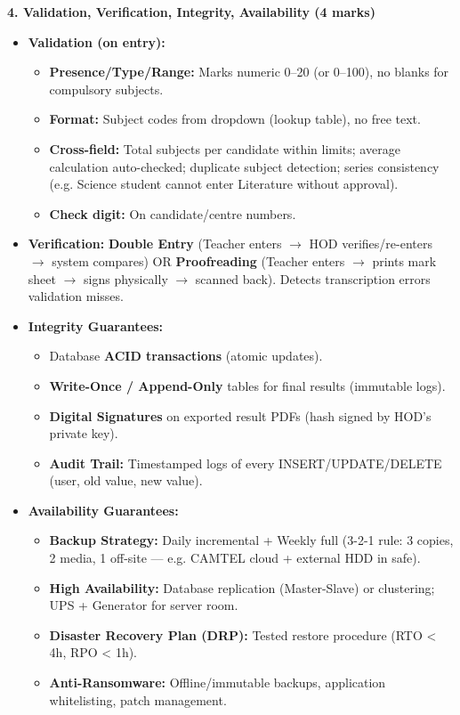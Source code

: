 \documentclass[11pt]{article}
\begin{document}
\begin{corrige}
\textbf{4. Validation, Verification, Integrity, Availability (4 marks)}
\begin{itemize}
\item \textbf{Validation (on entry):}
\begin{itemize}
\item \textbf{Presence/Type/Range:} Marks numeric 0–20 (or 0–100), no blanks for compulsory subjects.
\item \textbf{Format:} Subject codes from dropdown (lookup table), no free text.
\item \textbf{Cross-field:} Total subjects per candidate within limits; average calculation auto-checked; duplicate subject detection; series consistency (e.g. Science student cannot enter Literature without approval).
\item \textbf{Check digit:} On candidate/centre numbers.
\end{itemize}
\item \textbf{Verification:} \textbf{Double Entry} (Teacher enters $\to$ HOD verifies/re-enters $\to$ system compares) OR \textbf{Proofreading} (Teacher enters $\to$ prints mark sheet $\to$ signs physically $\to$ scanned back). Detects transcription errors validation misses.
\item \textbf{Integrity Guarantees:}
\begin{itemize}
\item Database \textbf{ACID transactions} (atomic updates).
\item \textbf{Write-Once / Append-Only} tables for final results (immutable logs).
\item \textbf{Digital Signatures} on exported result PDFs (hash signed by HOD's private key).
\item \textbf{Audit Trail:} Timestamped logs of every INSERT/UPDATE/DELETE (user, old value, new value).
\end{itemize}
\item \textbf{Availability Guarantees:}
\begin{itemize}
\item \textbf{Backup Strategy:} Daily incremental + Weekly full (3-2-1 rule: 3 copies, 2 media, 1 off-site — e.g. CAMTEL cloud + external HDD in safe).
\item \textbf{High Availability:} Database replication (Master-Slave) or clustering; UPS + Generator for server room.
\item \textbf{Disaster Recovery Plan (DRP):} Tested restore procedure (RTO < 4h, RPO < 1h).
\item \textbf{Anti-Ransomware:} Offline/immutable backups, application whitelisting, patch management.
\end{itemize}
\end{itemize}


\end{corrige}
\end{document}
